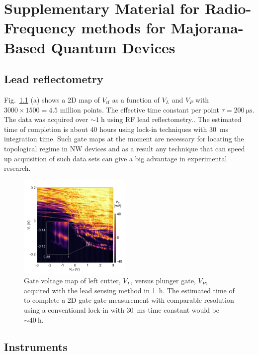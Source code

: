 \chapter{Supplementary Material for Radio-Frequency methods for Majorana-Based Quantum Devices}


\section{Lead reflectometry}
\label{sec:majo_A}
Fig.~\ref{fig:majo_f} (a) shows a 2D map of $V_\textrm{rf}$ as a function of $V_{L}$ and $V_{P}$ with $3000 \times 1500 = 4.5$ million points. The effective time constant per point $\tau= \SI{200}{\micro\second}$. The data was acquired over $\sim \SI{1}{\hour}$ using RF lead reflectometry.. The estimated time of completion is about 40 hours using lock-in techniques with \SI{30}{\milli\second} integration time. Such gate maps at the moment are necessary for locating the topological regime in NW devices and as a result any technique that can speed up acquisition of such data sets can give a big advantage in experimental research.

\begin{figure}
    \includegraphics[width=0.48\textwidth]{Fig6-2.pdf}
      \caption[Fast high-resolution charge sensing]{Gate voltage map of left cutter, $V_{L}$, versus plunger gate, $V_{P}$, acquired with the lead sensing method in \SI{1}{\hour}. The estimated time of to complete a 2D gate-gate measurement with comparable resolution using a conventional lock-in with \SI{30}{\milli\second} time constant would be $\sim \SI{40}{\hour}$.}
      \label{fig:majo_f}
\end{figure}

\section{Instruments}
\label{sec:majo_B}

